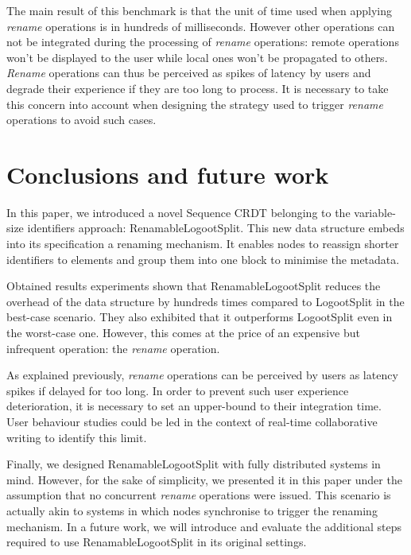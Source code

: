 \documentclass[sigplan,10pt]{acmart}
\begin{document}
The main result of this benchmark is that the unit of time used when applying \emph{rename} operations is in hundreds of milliseconds.
However other operations can not be integrated during the processing of \emph{rename} operations: remote operations won't be displayed to the user while local ones won't be propagated to others.
\emph{Rename} operations can thus be perceived as spikes of latency by users and degrade their experience if they are too long to process.
It is necessary to take this concern into account when designing the strategy used to trigger \emph{rename} operations to avoid such cases.

\section{Conclusions and future work}
\label{sec:conclusion}

In this paper, we introduced a novel Sequence \ac{CRDT} belonging to the variable-size identifiers approach: RenamableLogootSplit.
This new data structure embeds into its specification a renaming mechanism.
It enables nodes to reassign shorter identifiers to elements and group them into one block to minimise the metadata.

Obtained results experiments shown that RenamableLogootSplit reduces the overhead of the data structure by hundreds times compared to LogootSplit in the best-case scenario.
They also exhibited that it outperforms LogootSplit even in the worst-case one.
However, this comes at the price of an expensive but infrequent operation: the \emph{rename} operation.

As explained previously, \emph{rename} operations can be perceived by users as latency spikes if delayed for too long.
In order to prevent such user experience deterioration, it is necessary to set an upper-bound to their integration time.
User behaviour studies could be led in the context of real-time collaborative writing to identify this limit.

Finally, we designed RenamableLogootSplit with fully distributed systems in mind.
However, for the sake of simplicity, we presented it in this paper under the assumption that no concurrent \emph{rename} operations were issued.
This scenario is actually akin to systems in which nodes synchronise to trigger the renaming mechanism.
In a future work, we will introduce and evaluate the additional steps required to use RenamableLogootSplit in its original settings.


\end{document}
